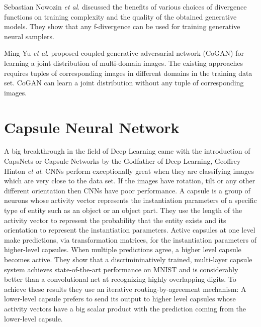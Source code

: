 Sebastian Nowozin \textit{et al}. \cite{vardivmin} discussed the benefits of various choices of divergence functions on training complexity and the quality of the obtained generative models. They show that any f-divergence can be used for training generative neural samplers. 
\par\bigskip

Ming-Yu \textit{et al}. \cite{copgan} proposed coupled generative adversarial network (CoGAN) for learning a joint distribution of multi-domain images. The existing approaches requires tuples of corresponding images in different domains in the training data set. CoGAN can learn a joint distribution without any tuple of corresponding images.
\par\bigskip

\section{Capsule Neural Network} %
\label{sec:capsule_neural_network}
A big breakthrough in the field of Deep Learning came with the introduction of CapsNets or Capsule Networks \cite{capsnet} by the Godfather of Deep Learning, Geoffrey Hinton \textit{et al}. CNNs perform exceptionally great when they are classifying images which are very close to the data set. If the images have rotation, tilt or any other different orientation then CNNs have poor performance. A capsule is a group of neurons whose activity vector represents the instantiation parameters of a specific type of entity such as an object or an object part. They use the length of the activity vector to represent the probability that the entity exists and its orientation to represent the instantiation parameters. Active capsules at one level make predictions, via transformation matrices, for the instantiation parameters of higher-level capsules. When multiple predictions agree, a higher level capsule becomes active. They show that a discrimininatively trained, multi-layer capsule system achieves state-of-the-art performance on MNIST and is considerably better than a convolutional net at recognizing highly overlapping digits. To achieve these results they use an iterative routing-by-agreement mechanism: A lower-level capsule prefers to send its output to higher level capsules whose activity vectors have a big scalar product with the prediction coming from the lower-level capsule.
